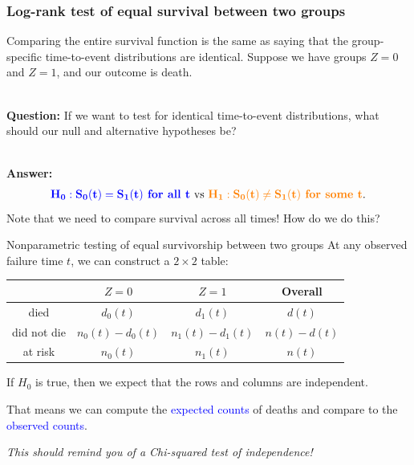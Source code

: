 \documentclass[10pt,t]{beamer}
\begin{document}
\begin{frame}
\frametitle{Log-rank test of equal survival between two groups}

Comparing the entire survival function is the same as saying that the group-specific time-to-event distributions are identical. Suppose we have groups $Z = 0$ and $Z = 1$, and our outcome is death.
\\ ~\ 

\textbf{Question:} If we want to test for identical time-to-event distributions, what should our null and alternative hypotheses be?   
\\ ~\ 

\textbf{Answer:}
\begin{align*}
\mathbf{\textcolor{blue}{H_0: S_0(t) = S_1(t) \text{\textbf{ for all }} t} \ \text{vs} \ \textcolor{orange}{H_1: S_0(t) \neq S_1(t) \text{\textbf{ for some }}t}}.
\end{align*}   
Note that we need to compare survival across all times! How do we do this? 
\end{frame}

\begin{frame}{Nonparametric testing of equal survivorship between two groups}
At any observed failure time $t$, we can construct a $2 \times 2$ table:

\bigskip

\begin{center}
	\begin{tabular}{c|c|c|c}
		& $Z = 0$ & $Z = 1$ & Overall\\
		\hline
		died & $d_0(t)$ & $d_1(t)$ & $d(t)$ \\
		did not die & $n_0(t) - d_0(t)$ & $n_1(t) - d_1(t)$ & $n(t) - d(t)$\\
		at risk & $n_0(t)$ & $n_1(t)$ & $n(t)$
	\end{tabular}
\end{center}

\medskip

If $H_0$ is true, then we expect that the rows and columns are independent.

\bigskip

 That means we can compute the \textcolor{blue}{expected counts} of deaths and compare to the \textcolor{blue}{observed counts}.
 
 \bigskip
 
 \textit{This should remind you of a Chi-squared test of independence!}
\end{frame}
\end{document}
